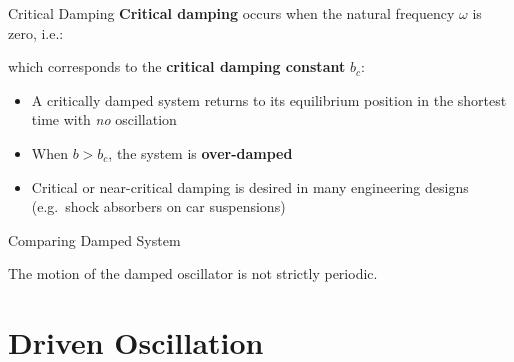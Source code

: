 \documentclass[12pt,compress,aspectratio=169]{beamer}
\begin{document}
\begin{frame}{Critical Damping}
  \textbf{Critical damping} occurs when the natural frequency $\omega$ is zero,
  i.e.:
  

  which corresponds to the \textbf{critical damping constant} $b_c$:

  \begin{itemize}
  \item A critically damped system returns to its equilibrium position in the
    shortest time with \emph{no} oscillation
  \item When $b>b_c$, the system is \textbf{over-damped}
  \item Critical or near-critical damping is desired in many engineering
    designs (e.g.\ shock absorbers on car suspensions)
  \end{itemize}
\end{frame}



\begin{frame}{Comparing Damped System}
  \centering
  
  The motion of the damped oscillator is not strictly periodic.
\end{frame}



%
%
%
%
%



\section{Driven Oscillation}
\end{document}

